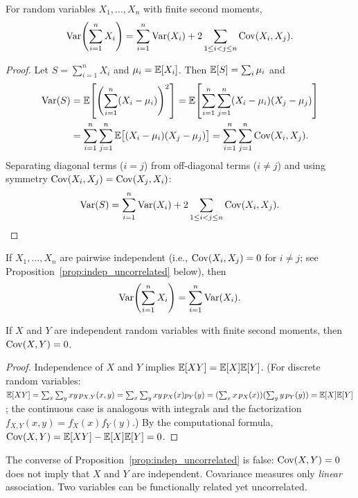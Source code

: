 \documentclass[11pt,a4paper]{article}
\begin{document}
\begin{theorem}
\label{thm:var_sum}
For random variables $X_1, \ldots, X_n$ with finite second moments,
\[
    \operatorname{Var}\!\left(\sum_{i=1}^n X_i\right)
    = \sum_{i=1}^n \operatorname{Var}(X_i)
    + 2 \sum_{1 \leq i < j \leq n} \operatorname{Cov}(X_i, X_j).
\]
\end{theorem}

\begin{proof}
Let $S = \sum_{i=1}^n X_i$ and $\mu_i = \mathbb{E}[X_i]$. Then
$\mathbb{E}[S] = \sum_i \mu_i$ and
\begin{align*}
    \operatorname{Var}(S) &= \mathbb{E}\!\left[\left(\sum_{i=1}^n (X_i - \mu_i)\right)^2\right]
    = \mathbb{E}\!\left[\sum_{i=1}^n \sum_{j=1}^n
    (X_i - \mu_i)(X_j - \mu_j)\right] \\
    &= \sum_{i=1}^n \sum_{j=1}^n
    \mathbb{E}\bigl[(X_i - \mu_i)(X_j - \mu_j)\bigr]
    = \sum_{i=1}^n \sum_{j=1}^n \operatorname{Cov}(X_i, X_j).
\end{align*}
Separating diagonal terms ($i = j$) from off-diagonal terms ($i \neq j$)
and using symmetry $\operatorname{Cov}(X_i, X_j) = \operatorname{Cov}(X_j, X_i)$:
\[
    \operatorname{Var}(S) = \sum_{i=1}^n \operatorname{Var}(X_i)
    + 2\sum_{1 \leq i < j \leq n} \operatorname{Cov}(X_i, X_j). \qedhere
\]
\end{proof}

\begin{corollary}
\label{cor:var_indep_sum}
If $X_1, \ldots, X_n$ are pairwise independent (i.e.,
$\operatorname{Cov}(X_i, X_j) = 0$ for $i \neq j$; see
Proposition~\ref{prop:indep_uncorrelated} below), then
\[
    \operatorname{Var}\!\left(\sum_{i=1}^n X_i\right)
    = \sum_{i=1}^n \operatorname{Var}(X_i).
\]
\end{corollary}

\begin{proposition}
\label{prop:indep_uncorrelated}
If $X$ and $Y$ are independent random variables with finite second
moments, then $\operatorname{Cov}(X, Y) = 0$.
\end{proposition}

\begin{proof}
Independence of $X$ and $Y$ implies $\mathbb{E}[XY] = \mathbb{E}[X]\mathbb{E}[Y]$. (For
discrete random variables: $\mathbb{E}[XY] = \sum_x \sum_y xy \, p_{X,Y}(x,y)
= \sum_x \sum_y xy \, p_X(x) p_Y(y) = (\sum_x x \, p_X(x))(\sum_y y
\, p_Y(y)) = \mathbb{E}[X]\mathbb{E}[Y]$; the continuous case is analogous with
integrals and the factorization $f_{X,Y}(x,y) = f_X(x) f_Y(y)$.)
By the computational formula,
$\operatorname{Cov}(X,Y) = \mathbb{E}[XY] - \mathbb{E}[X]\mathbb{E}[Y] = 0$.
\end{proof}

\begin{warning}[title={Uncorrelated Does Not Imply Independent}]
The converse of Proposition~\ref{prop:indep_uncorrelated} is false:
$\operatorname{Cov}(X, Y) = 0$ does not imply that $X$ and $Y$ are independent.
Covariance measures only \emph{linear} association. Two variables can be
functionally related yet uncorrelated.
\end{warning}
\end{document}
